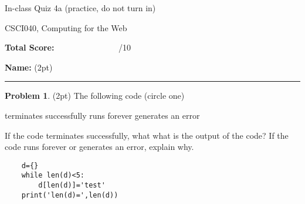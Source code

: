 \documentclass[10pt]{article}
\theoremstyle{definition}
\newtheorem{problem}{Problem}
\begin{document}
\begin{center}
    {
\Large
In-class Quiz 4a (practice, do not turn in)
}

    \vspace{0.1in}
CSCI040, Computing for the Web

    \vspace{0.1in}
\end{center}

\vspace{0.25in}
\noindent
\textbf{Total Score:} ~~~~~~~~~~~~~~~/10

\vspace{0.5in}
\noindent
\textbf{Name:} (2pt)

\noindent
\rule{\textwidth}{0.1pt}
\vspace{0.25in}

\begin{problem}
    (2pt)
    The following code (circle one)
    
    \vspace{0.25in}
    \hspace{0.5in}terminates successfully
    \hspace{1in}runs forever
    \hspace{1in}generates an error
    \vspace{0.25in}

    \noindent
    If the code terminates successfully, what what is the output of the code?
    If the code runs forever or generates an error, explain why.
\end{problem}
\begin{lstlisting}
    d={}
    while len(d)<5:
        d[len(d)]='test'
    print('len(d)=',len(d))
\end{lstlisting}
\vspace{1.5in}
\end{document}
